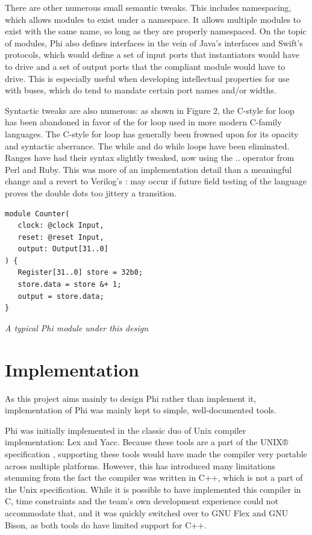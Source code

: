 \documentclass[10pt, two column]{article}
\theoremstyle{definition}
\begin{document}
There are other numerous small semantic tweaks. This includes namespacing, which allows modules to exist under a namespace. It allows multiple modules to exist with the same name, so long as they are properly namespaced. On the topic of modules, Phi also defines interfaces in the vein of Java’s 
interfaces and Swift’s protocols, which would define a set of input ports that instantiators would have to drive and a set of output ports that the compliant module would have to drive. This is especially useful when developing intellectual properties for use with buses, which do tend to mandate certain port names and/or widths.\newline

Syntactic tweaks are also numerous: as shown in Figure 2, the C-style for loop has been abandoned in favor of the for loop used in more modern C-family languages. The C-style for loop has generally been frowned upon for its opacity and syntactic aberrance. The while and do while loops have been eliminated. Ranges have had their syntax slightly tweaked, now using the .. operator from Perl and Ruby. This was more of an implementation detail than a meaningful change and a revert to Verilog’s : may occur if future field testing of the language proves the double dots too jittery a transition.\newline

\begin{lstlisting}
module Counter(
   clock: @clock Input,
   reset: @reset Input,
   output: Output[31..0]
) {
   Register[31..0] store = 32b0;
   store.data = store &+ 1;
   output = store.data;
}
\end{lstlisting}
\begin{center}
\textit{A typical Phi module under this design}
\end{center}

\section{Implementation}

As this project aims mainly to design Phi rather than implement it, implementation of Phi was mainly kept to simple, well-documented tools.\newline

Phi was initially implemented in the classic duo of Unix compiler implementation: Lex and Yacc. Because these tools are a part of the UNIX® specification \cite{openGroupBaseSpecif_2018}, supporting these tools would have made the compiler very portable across multiple platforms. However, this has introduced many limitations stemming from the fact the compiler was written in C++, which is not a part of the Unix specification. While it is possible to have implemented this compiler in C, time constraints and the team’s own development experience could not accommodate that, and it was quickly switched over to GNU Flex and GNU Bison, as both tools do have limited support for C++. \newline
\end{document}
